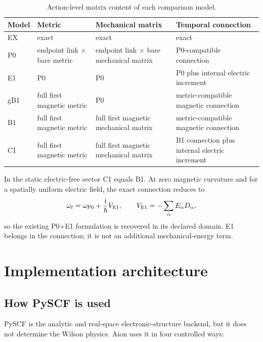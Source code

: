 \documentclass[11pt]{article}
\newcommand{\iu}{\mathrm{i}}
\begin{document}
\begin{table}[htbp]
\centering
\caption{Action-level matrix content of each comparison model.}
\label{tab:model-hierarchy}
\begin{tabularx}{\textwidth}{lYYY}
\toprule
Model & Metric & Mechanical matrix & Temporal connection \\
\midrule
EX & exact & exact & exact \\
P0 & endpoint link $\times$ bare metric & endpoint link $\times$ bare mechanical matrix & P0-compatible connection \\
E1 & P0 & P0 & P0 plus internal electric increment \\
gB1 & full first magnetic metric & P0 & metric-compatible magnetic connection \\
B1 & full first magnetic metric & full first magnetic mechanical matrix & metric-compatible magnetic connection \\
C1 & full first magnetic metric & full first magnetic mechanical matrix & B1 connection plus internal electric increment \\
\bottomrule
\end{tabularx}
\end{table}

In the static electric-free sector C1 equals B1.  At zero magnetic curvature
and for a spatially uniform electric field, the exact connection reduces to
\begin{equation}
 \omega_t=\omega_{\rm P0}+\frac{\iu}{\hbar}V_{\rm E1},
 \qquad V_{\rm E1}=-\sum_\alpha E_\alpha D_\alpha,
\end{equation}
so the existing P0+E1 formulation is recovered in its declared domain.  E1
belongs in the connection; it is not an additional mechanical-energy term.

\section{Implementation architecture}

\subsection{How PySCF is used}

PySCF is the analytic and real-space electronic-structure backend, but it
does not determine the Wilson physics.  Aion uses it in four controlled ways:
\end{document}
